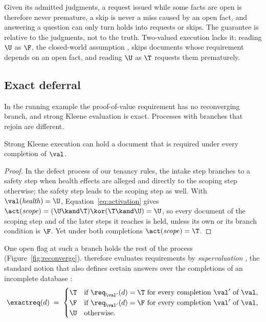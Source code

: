 Given its admitted judgments, a request issued while some facts are open is therefore never premature, a skip is never a miss caused by an open fact, and answering a question can only turn holds into requests or skips. The guarantee is relative to the judgments, not to the truth. Two-valued execution lacks it: reading $\U$ as $\F$, the closed-world assumption \cite{reiter1978closed}, skips documents whose requirement depends on an open fact, and reading $\U$ as $\T$ requests them prematurely.

\subsection{Exact deferral}
\label{sec:exact}

In the running example the proof-of-value requirement has no reconverging branch, and strong Kleene evaluation is exact. Processes with branches that rejoin are different.

\begin{proposition}[Incompleteness]
\label{prop:incomplete}
Strong Kleene execution can hold a document that is required under every completion of $\val$.
\end{proposition}
\begin{proof}
In the defect process of our tenancy rules, the intake step branches to a safety step when health effects are alleged and directly to the scoping step otherwise; the safety step leads to the scoping step as well. With $\val(\mathit{health})=\U$, Equation~\eqref{eq:activation} gives $\act(\mathit{scope})=(\U\kand\T)\kor(\T\kand\U)=\U$, so every document of the scoping step and of the later steps it reaches is held, unless its own or its branch condition is $\F$. Yet under both completions $\act(\mathit{scope})=\T$.
\end{proof}

One open flag at such a branch holds the rest of the process (Figure~\ref{fig:reconverge}). \casepath therefore evaluates requirements by \emph{supervaluation} \cite{vanfraassen1966singular}, the standard notion that also defines certain answers over the completions of an incomplete database \cite{imielinski1984incomplete}:
\begin{equation}
\exactreq(d) \;=\;
\begin{cases}
\T & \text{if } \req_{\val'}(d)=\T \text{ for every completion } \val' \text{ of } \val,\\
\F & \text{if } \req_{\val'}(d)=\F \text{ for every completion } \val' \text{ of } \val,\\
\U & \text{otherwise.}
\end{cases}
\label{eq:exact}
\end{equation}

